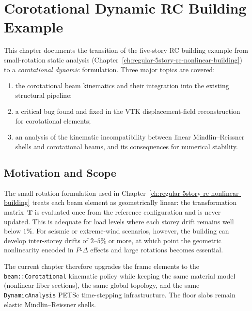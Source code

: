
\chapter{Corotational Dynamic RC Building Example}
\label{ch:corotational-dynamic-building}

This chapter documents the transition of the five-story RC building
example from small-rotation static analysis
(Chapter~\ref{ch:regular-5story-rc-nonlinear-building}) to a
\emph{corotational dynamic} formulation.  Three major topics are covered:
\begin{enumerate}
  \item the corotational beam kinematics and their integration into the
        existing structural pipeline;
  \item a critical bug found and fixed in the VTK displacement-field
        reconstruction for corotational elements;
  \item an analysis of the kinematic incompatibility between linear
        Mindlin--Reissner shells and corotational beams, and its
        consequences for numerical stability.
\end{enumerate}


\section{Motivation and Scope}
\label{sec:corot-motivation}

The small-rotation formulation used in
Chapter~\ref{ch:regular-5story-rc-nonlinear-building} treats each beam
element as geometrically linear: the transformation matrix~$\mathbf{T}$
is evaluated once from the reference configuration and is never updated.
This is adequate for load levels where each storey drift remains well
below $1\%$.  For seismic or extreme-wind scenarios, however, the
building can develop inter-storey drifts of $2$--$5\%$ or more, at which
point the geometric nonlinearity encoded in $P$-$\Delta$ effects and
large rotations becomes essential.

The current chapter therefore upgrades the frame elements to the
\texttt{beam::Corotational} kinematic policy while keeping the same
material model (nonlinear fiber sections), the same global topology, and
the same \texttt{DynamicAnalysis} PETSc time-stepping infrastructure.
The floor slabs remain elastic Mindlin--Reissner shells.


